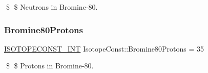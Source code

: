 \$ \$ Neutrons in Bromine-\/80. \mbox{\label{group___isotope_const-_bromine-_br80_gae3c11b7094d836504a038fa37feaddff}} 
\subsubsection{\texorpdfstring{Bromine80\+Protons}{Bromine80Protons}}
{\footnotesize\ttfamily \mbox{\hyperlink{group___isotope_const-_macros_ga5f18360b3e99483a35c32d789e62621c}{I\+S\+O\+T\+O\+P\+E\+C\+O\+N\+S\+T\+\_\+\+I\+NT}} Isotope\+Const\+::\+Bromine80\+Protons = 35}

\$ \$ Protons in Bromine-\/80. 